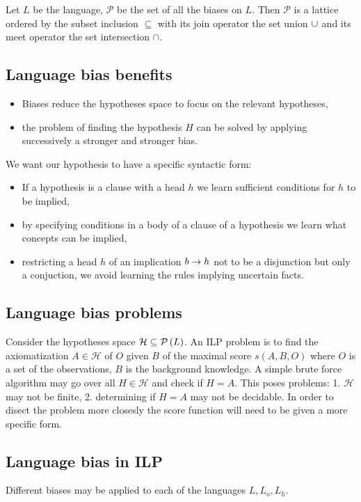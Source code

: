 \begin{remark}
Let $L$ be the language, $\mathcal{P}$ be the set of all the biases on $L$. Then $\mathcal{P}$ is a lattice ordered by the subset inclusion $\subseteq$ with its join operator the set union $\cup$ and its meet operator the set intersection $\cap$.
\end{remark}

\subsection{Language bias benefits}
\begin{itemize}
\item Biases reduce the hypotheses space to focus on the relevant hypotheses,
\item the problem of finding the hypothesis $H$ can be solved by applying successively a stronger and stronger bias.
\end{itemize}
We want our hypothesis to have a specific syntactic form:
\begin{itemize}
\item If a hypothesis is a clause with a head $h$ we learn sufficient conditions for $h$ to be implied,
\item by specifying conditions in a body of a clause of a hypothesis we learn what concepts can be implied,
\item restricting a head $h$ of an implication $b \to h$ not to be a disjunction but only a conjuction, we avoid learning the rules implying uncertain facts.
\end{itemize}

\subsection{Language bias problems}
Consider the hypotheses space $\mathcal{H} \subseteq \mathcal{P} \left({ L }\right)$. An ILP problem is to find the axiomatization $A \in \mathcal{H}$ of $O$ given $B$ of the maximal score $s(A,B,O)$ where $O$ is a set of the observations, $B$ is the background knowledge.
A simple brute force algorithm may go over all $H \in \mathcal{H}$ and check if $H=A$. This poses problems:
1. $\mathcal{H}$ may not be finite,
2. determining if $H=A$ may not be decidable.
In order to disect the problem more closesly the score function will need to be given a more specific form.

\subsection{Language bias in ILP}
Different biases may be applied to each of the languages $L, L_o, L_h$. 

